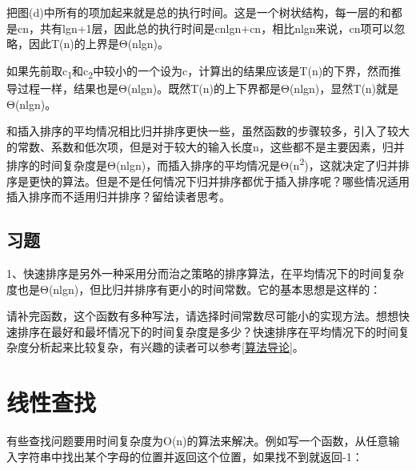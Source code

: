 把图(d)中所有的项加起来就是总的执行时间。这是一个树状结构，每一层的和都是cn，共有lgn+\BookSplit{}1层，因此总的执行时间是cnlgn+\BookSplit{}cn，相比nlgn来说，cn项可以忽略，因此T(n)的上界是Θ(nlgn)。



如果先前取c\textsubscript{1}和c\textsubscript{2}中较小的一个设为c，计算出的结果应该是T(n)的下界，然而推导过程一样，结果也是Θ(nlgn)。既然T(n)的上下界都是Θ(nlgn)，显然T(n)就是Θ(nlgn)。



和插入排序的平均情况相比归并排序更快一些，虽然函数的步骤较多，引入了较大的常数、系数和低次项，但是对于较大的输入长度n，这些都不是主要因素，归并排序的时间复杂度是Θ(nlgn)，而插入排序的平均情况是Θ(n\textsuperscript{2})，这就决定了归并排序是更快的算法。但是不是任何情况下归并排序都优于插入排序呢？哪些情况适用插入排序而不适用归并排序？留给读者思考。


\subsection*{习题}
%


1、快速排序是另外一种采用分而治之策略的排序算法，在平均情况下的时间复杂度也是Θ(nlgn)，但比归并排序有更小的时间常数。它的基本思想是这样的：




请补完函数，这个函数有多种写法，请选择时间常数尽可能小的实现方法。想想快速排序在最好和最坏情况下的时间复杂度是多少？快速排序在平均情况下的时间复杂度分析起来比较复杂，有兴趣的读者可以参考\hyperlink{db.bi01.bibli.algorithm}{[算法导论]}。




\section{线性查找}
%
有些查找问题要用时间复杂度为O(n)的算法来解决。例如写一个函数，从任意输入字符串中找出某个字母的位置并返回这个位置，如果找不到就返回-1：



